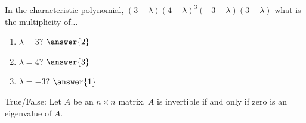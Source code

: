 \documentclass{ximera}
\begin{document}
  	  		     \begin{question} In the characteristic polynomial, $(3-\lambda)(4-\lambda)^3(-3-\lambda)(3-\lambda)$ what is the multiplicity of$\dots$\\
  	  		     	
  	  		     	\begin{enumerate}
  	  		     		\item $\lambda = 3$? $\answer{2}$\\
  	  		     		
  	  		     		\item $\lambda = 4$? $\answer{3}$\\
  	  		     		\item $\lambda = -3$? $\answer{1}$\\
  	  		     	\end{enumerate}
  	  		     	
  	  		     \end{question}	
  	  		      \begin{question} True/False: Let $A$ be an $n\times n$ matrix. $A$ is invertible if and only if zero is an eigenvalue of $A$.
  	  		      	
  	  		      \begin{multipleChoice}
  	  		      	\end{multipleChoice}
  	  		      	
  	  		      \end{question}	
  
\end{document}
